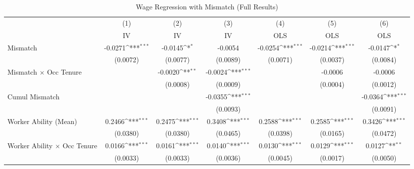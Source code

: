 {
\def\sym#1{\ifmmode^{#1}\else\(^{#1}\)\fi}
\begin{longtable}{l*{6}{c}}
\caption{Wage Regression with Mismatch (Full Results)}\\
\hline  \endfirsthead\hline  \endhead\hline  \endfoot\endlastfoot
                    &\multicolumn{1}{c}{(1)}&\multicolumn{1}{c}{(2)}&\multicolumn{1}{c}{(3)}&\multicolumn{1}{c}{(4)}&\multicolumn{1}{c}{(5)}&\multicolumn{1}{c}{(6)}\\
                    &\multicolumn{1}{c}{IV}&\multicolumn{1}{c}{IV}&\multicolumn{1}{c}{IV}&\multicolumn{1}{c}{OLS}&\multicolumn{1}{c}{OLS}&\multicolumn{1}{c}{OLS}\\
\hline  
Mismatch            &     -0.0271\sym{***}&     -0.0145\sym{*}  &     -0.0054         &     -0.0254\sym{***}&     -0.0214\sym{***}&     -0.0147\sym{*}  \\
                    &    (0.0072)         &    (0.0077)         &    (0.0089)         &    (0.0071)         &    (0.0037)         &    (0.0084)         \\
Mismatch $\times$ Occ Tenure&                     &     -0.0020\sym{**} &     -0.0024\sym{***}&                     &     -0.0006         &     -0.0006         \\
                    &                     &    (0.0008)         &    (0.0009)         &                     &    (0.0004)         &    (0.0012)         \\
Cumul Mismatch      &                     &                     &     -0.0355\sym{***}&                     &                     &     -0.0364\sym{***}\\
                    &                     &                     &    (0.0093)         &                     &                     &    (0.0091)         \\
Worker Ability (Mean)&      0.2466\sym{***}&      0.2475\sym{***}&      0.3408\sym{***}&      0.2588\sym{***}&      0.2585\sym{***}&      0.3426\sym{***}\\
                    &    (0.0380)         &    (0.0380)         &    (0.0465)         &    (0.0398)         &    (0.0165)         &    (0.0472)         \\
Worker Ability $\times$ Occ Tenure&      0.0166\sym{***}&      0.0161\sym{***}&      0.0140\sym{***}&      0.0130\sym{***}&      0.0129\sym{***}&      0.0127\sym{**} \\
                    &    (0.0033)         &    (0.0033)         &    (0.0036)         &    (0.0045)         &    (0.0017)         &    (0.0050)         \\

\end{longtable}}
